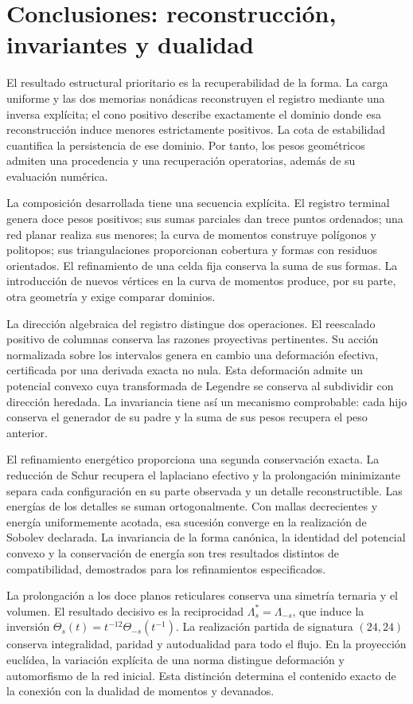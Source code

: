\documentclass[a4paper,10pt]{article}
\theoremstyle{definition}\newtheorem{definition}[theorem]{Definición}
\theoremstyle{remark}\newtheorem{remark}[theorem]{Observación}
\numberwithin{equation}{section}
\begin{document}
\section{Conclusiones: reconstrucción, invariantes y dualidad}
El resultado estructural prioritario es la recuperabilidad de la forma.
La carga uniforme y las dos memorias nonádicas reconstruyen el registro
mediante una inversa explícita; el cono positivo describe exactamente
el dominio donde esa reconstrucción induce menores estrictamente positivos.
La cota de estabilidad cuantifica la persistencia de ese dominio. Por
tanto, los pesos geométricos admiten una procedencia y una recuperación
operatorias, además de su evaluación numérica.

La composición desarrollada tiene una secuencia explícita. El registro
terminal genera doce pesos positivos; sus sumas parciales dan trece puntos
ordenados; una red planar realiza sus menores; la curva de momentos
construye polígonos y politopos; sus triangulaciones proporcionan cobertura
y formas con residuos orientados. El refinamiento de una celda fija conserva
la suma de sus formas. La introducción de nuevos vértices en la curva de
momentos produce, por su parte, otra geometría y exige comparar dominios.

La dirección algebraica del registro distingue dos operaciones. El
reescalado positivo de columnas conserva las razones proyectivas pertinentes.
Su acción normalizada sobre los intervalos genera en cambio una deformación
efectiva, certificada por una derivada exacta no nula. Esta deformación admite
un potencial convexo cuya transformada de Legendre se conserva al subdividir
con dirección heredada. La invariancia tiene así un mecanismo comprobable:
cada hijo conserva el generador de su padre y la suma de sus pesos recupera
el peso anterior.

El refinamiento energético proporciona una segunda conservación exacta.
La reducción de Schur recupera el laplaciano efectivo y la prolongación
minimizante separa cada configuración en su parte observada y un detalle
reconstructible. Las energías de los detalles se suman ortogonalmente.
Con mallas decrecientes y energía uniformemente acotada, esa sucesión
converge en la realización de Sobolev declarada. La invariancia de la
forma canónica, la identidad del potencial convexo y la conservación de
energía son tres resultados distintos de compatibilidad, demostrados
para los refinamientos especificados.

La prolongación a los doce planos reticulares conserva una simetría
ternaria y el volumen. El resultado decisivo es la reciprocidad
\(\Lambda_s^*=\Lambda_{-s}\), que induce la inversión
\(\Theta_s(t)=t^{-12}\Theta_{-s}(t^{-1})\). La realización partida de
signatura \((24,24)\) conserva integralidad, paridad y autodualidad para
todo el flujo. En la proyección euclídea, la variación explícita de una
norma distingue deformación y automorfismo de la red inicial. Esta
distinción determina el contenido exacto de la conexión con la dualidad
de momentos y devanados.
\end{document}
